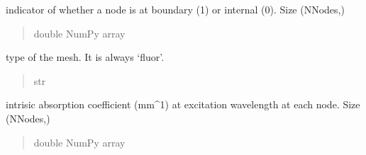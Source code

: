 \documentclass[letterpaper,10pt,english]{sphinxmanual}
\begin{document}
\begin{fulllineitems}
\begin{fulllineitems}
\end{fulllineitems}


\begin{fulllineitems}
\label{\detokenize{_autosummary/nirfasterff.base.fluor_mesh.fluormesh:nirfasterff.base.fluor_mesh.fluormesh.bndvtx}}
\pysigstartsignatures
\pysigline
{}
\pysigstopsignatures
\sphinxAtStartPar
indicator of whether a node is at boundary (1) or internal (0). Size (NNodes,)
\begin{quote}\begin{description}
\sphinxAtStartPar
double NumPy array

\end{description}\end{quote}

\end{fulllineitems}


\begin{fulllineitems}
\label{\detokenize{_autosummary/nirfasterff.base.fluor_mesh.fluormesh:nirfasterff.base.fluor_mesh.fluormesh.type}}
\pysigstartsignatures
\pysigline
{}
\pysigstopsignatures
\sphinxAtStartPar
type of the mesh. It is always ‘fluor’.
\begin{quote}\begin{description}
\sphinxAtStartPar
str

\end{description}\end{quote}

\end{fulllineitems}


\begin{fulllineitems}
\label{\detokenize{_autosummary/nirfasterff.base.fluor_mesh.fluormesh:nirfasterff.base.fluor_mesh.fluormesh.muax}}
\pysigstartsignatures
\pysigline
{}
\pysigstopsignatures
\sphinxAtStartPar
intrisic absorption coefficient (mm\textasciicircum{}\sphinxhyphen{}1) at excitation wavelength at each node. Size (NNodes,)
\begin{quote}\begin{description}
\sphinxAtStartPar
double NumPy array


\end{description}
\end{quote}
\end{fulllineitems}
\end{fulllineitems}
\end{document}
